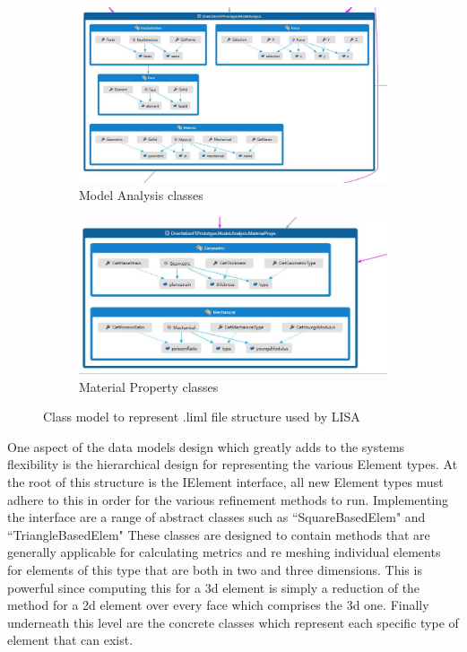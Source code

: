 \documentclass{article}
\begin{document}
\begin{figure}
\centering
\begin{subfigure}{.5\textwidth}
  \centering
  \includegraphics[width=0.9\linewidth]{DissoFEProto-ModelAnalysis.jpg}
  \caption{Model Analysis classes}
  \label{fig:sub1}
\end{subfigure}%
\begin{subfigure}{.5\textwidth}
  \centering
  \includegraphics[width=0.9\linewidth]{DissoFEProto-MaterialProps.jpg}
  \caption{Material Property classes}
  \label{fig:sub2}
\end{subfigure}
\label{fig:test}
\caption{Class model to represent .liml file structure used by LISA}
\end{figure}

\clearpage
\noindent
One aspect of the data models design which greatly adds to the systems flexibility is the hierarchical design for representing the various Element types. At the root of this structure is the IElement interface, all new Element types must adhere to this in order for the various refinement methods to run. Implementing the interface are a range of abstract classes such as ``SquareBasedElem" and ``TriangleBasedElem" These classes are designed to contain methods that are generally applicable for calculating metrics and re meshing individual elements for elements of this type that are both in two and three dimensions. This is powerful since computing this for a 3d element is simply a reduction of the method for a 2d element over every face which comprises the 3d one. Finally underneath this level are the concrete classes which represent each specific type of element that can exist.
\end{document}
